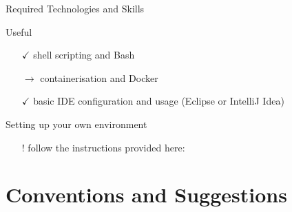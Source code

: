 \documentclass[presentation]{beamer}\mode<presentation>{\usetheme{AMSCesenaPurpleAndGold}}
\begin{document}
\begin{frame}[c,allowframebreaks]{Required Technologies and Skills}
	\begin{exampleblock}{Useful}
		\begin{itemize}
			\item[$\checkmark$] shell scripting and \alert{Bash}
			\item[$\rightarrow$] containerisation and \alert{Docker}
			\item[$\checkmark$] basic IDE configuration and usage (\alert{Eclipse} or \alert{IntelliJ Idea})
		\end{itemize}
	\end{exampleblock}

	\begin{alertblock}{Setting up your own environment}
		\begin{itemize}
			\item[!] follow the instructions provided here: 
		\end{itemize}
	\end{alertblock}

\end{frame}

\section{Conventions and Suggestions}
\end{document}
